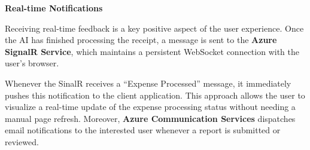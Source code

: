 \vspace{0.5cm}

\textbf{Real-time Notifications}

Receiving real-time feedback is a key positive aspect of the user experience. Once the AI has finished processing the receipt, a message is sent to the \textbf{Azure SignalR Service}, which maintains a persistent WebSocket connection with the user's browser. 

Whenever the SinalR receives a “Expense Processed” message, it immediately pushes this notification to the client application. This approach allows the user to visualize a real-time update of the expense processing status without needing a manual page refresh. Moreover, \textbf{Azure Communication Services} dispatches email notifications to the interested user whenever a report is submitted or reviewed.

